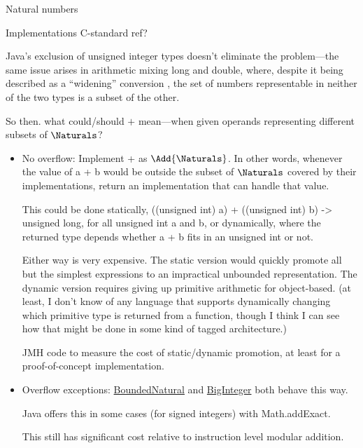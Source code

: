\documentclass[12pt]{PalisadesLakesBook}
\begin{document}
\begin{plSection}{Natural numbers}
\begin{plSection}{Implementations}
\TODO C-standard ref?

\NOTE Java's exclusion of unsigned integer types doesn't
eliminate the problem---the same issue arises in arithmetic mixing
{\javaFont long} and {\javaFont double},
where, despite it being described as a ``widening'' conversion 
\cite[section 5.1.2]{GoslingEtAl:2021:JLS16},
the set of numbers representable in neither of the two types
is a subset of the other.

So then. what could/should $+$ mean---when given operands
representing different subsets of $\Naturals$?
\begin{itemize}
  \item No overflow: Implement {\javaFont +} as 
  $\Add{\Naturals}$. In other words, whenever the value of 
  {\javaFont a + b} would be outside the subset of $\Naturals$
  covered by their implementations, return an implementation
  that can handle that value. 
  
  This could be done statically,
  {\javaFont 
  ((unsigned int) a) + ((unsigned int) b) -> unsigned long},
  for all {\javaFont unsigned int} {\javaFont a} and {\javaFont b},
  or dynamically, where the returned type depends whether 
  {\javaFont a + b} fits in an {\javaFont unsigned int} or not.
  
  Either way is very expensive. The static version would quickly
  promote all but the simplest expressions to an impractical
  unbounded representation.
  The dynamic version requires giving up primitive arithmetic
  for object-based. (at least, I don't know of any language 
  that supports dynamically changing which primitive type is
  returned from a function, though I think I can see how 
  that might be done in some kind of tagged architecture.)
  
  \TODO JMH code to measure the cost of static/dynamic promotion,
  at least for a proof-of-concept implementation.
  
  \item Overflow exceptions: 
  \href{https://github.com/palisades-lakes/nzqr/blob/main/src/main/java/nzqr/java/numbers/BoundedNatural.java}
{\javaFont BoundedNatural} and 
\href{https://github.com/openjdk/jdk/blob/master/src/java.base/share/classes/java/math/BigInteger.java}
{\javaFont BigInteger}
both behave this way.
  
  Java offers this in some cases (for signed integers)
  with {\javaFont Math.addExact}.
  
  This still has significant cost relative to instruction level
  modular addition.
  

\end{itemize}
\end{plSection}
\end{plSection}
\end{document}
